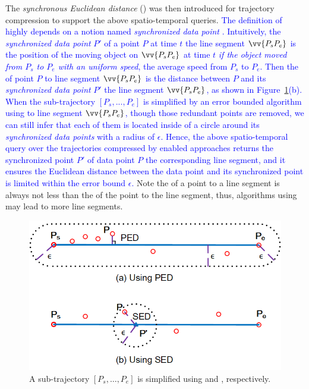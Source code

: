 The \emph{synchronous Euclidean distance} (\sed) was then introduced for trajectory compression to support the above spatio-temporal queries.
\textcolor{blue}{The definition of \sed highly depends on a notion named \emph{synchronized data point} \cite{Meratnia:Spatiotemporal}. Intuitively, the \emph{synchronized data point} $P'$ of a point $P$ at time $t$ \wrt the line segment $\vv{P_sP_e}$  is the position of the moving object on $\vv{P_sP_e}$ at time $t$ \emph{if the object moved from $P_s$ to $P_e$ with an uniform speed}, \ie the average speed from $P_s$ to $P_e$.}
\textcolor{blue}{Then the \sed of point $P$ to line segment $\vv{P_sP_e}$ is the distance between $P$ and its \emph{synchronized data point} $P'$  \wrt the line segment $\vv{P_sP_e}$, as shown in Figure~\ref{fig:distances}(b).}
\textcolor{blue}{When the sub-trajectory $[P_s, ..., P_e]$ is simplified by an error bounded \lsa algorithm using \sed to line segment $\vv{P_sP_e}$, though those redundant points are removed, we can still infer that each of them is located inside of a circle around its \emph{synchronized data points} with a radius of $\epsilon$.}
\textcolor{blue}{Hence, the above spatio-temporal query over the trajectories compressed by \sed enabled approaches returns the synchronized point $P'$ of data point $P$ \wrt the corresponding line segment, and it ensures the Euclidean distance between the data point and its synchronized point is limited within the error bound $\epsilon$.}
%
Note the \sed of a point to a line segment is always not less than the \ped of the point to the line segment, thus, \lsa algorithms using \sed may lead to more line segments.


\begin{figure}[tb!]
\centering
\includegraphics[scale=1.1]{figures/Fig-Distances.png}
\caption{\small A sub-trajectory $[P_s, \ldots, P_e]$ is simplified using \ped and \sed, respectively.}
\vspace{-3ex}
\label{fig:distances}
\end{figure}


